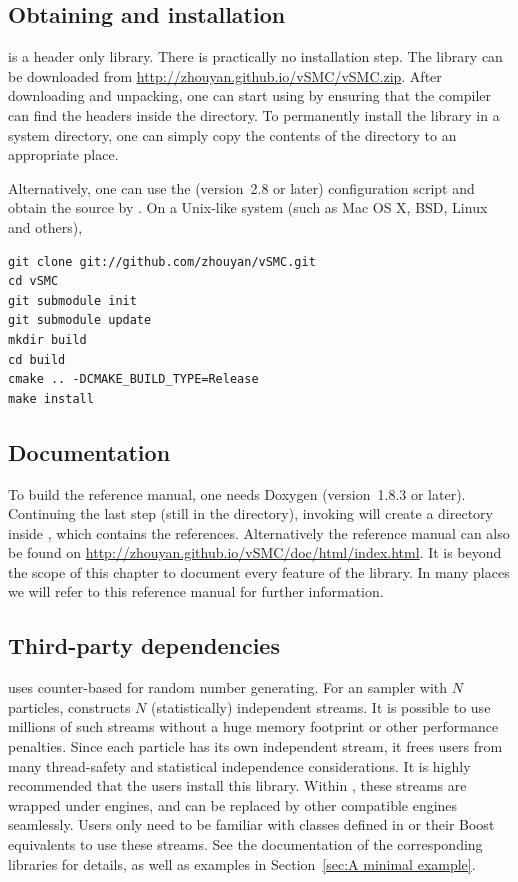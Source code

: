 \subsection{Obtaining and installation}

\vsmc is a header only library. There is practically no installation step. The
library can be downloaded from \url{http://zhouyan.github.io/vSMC/vSMC.zip}.
After downloading and unpacking, one can start using \vsmc by ensuring that
the compiler can find the headers inside the  directory. To
permanently install the library in a system directory, one can simply copy the
contents of the  directory to an appropriate place.

Alternatively, one can use the \cmake (version~2.8 or later) configuration
script and obtain the source by \git. On a Unix-like system (such as Mac OS X,
BSD, Linux and others),
\begin{verbatim}
git clone git://github.com/zhouyan/vSMC.git
cd vSMC
git submodule init
git submodule update
mkdir build
cd build
cmake .. -DCMAKE_BUILD_TYPE=Release
make install
\end{verbatim}

\subsection{Documentation}

To build the reference manual, one needs Doxygen (version~1.8.3 or later).
Continuing the last step (still in the  directory), invoking
 will create a  directory inside , which
contains the \html references. Alternatively the reference manual can also be
found on \url{http://zhouyan.github.io/vSMC/doc/html/index.html}. It is beyond
the scope of this chapter to document every feature of the \vsmc library. In
many places we will refer to this reference manual for further information.

\subsection{Third-party dependencies}

\vsmc uses \random \cite{Salmon:2011um} counter-based \rng for random number
generating. For an \smc sampler with $N$ particles, \vsmc constructs $N$
(statistically) independent \rng streams. It is possible to use millions of
such streams without a huge memory footprint or other performance penalties.
Since each particle has its own independent \rng stream, it frees users from
many thread-safety and statistical independence considerations. It is highly
recommended that the users install this library. Within \vsmc, these \rng
streams are wrapped under \cppoo{} \rng engines, and can be replaced by other
compatible \rng engines seamlessly. Users only need to be familiar with
classes defined in \cppoo{}  or their Boost equivalents to use
these \rng streams. See the documentation of the corresponding libraries for
details, as well as examples in Section~\ref{sec:A minimal example}.

